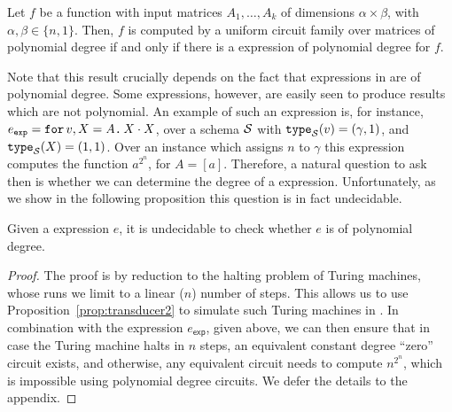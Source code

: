 \begin{theorem}
\label{th-equivalence}
Let $f$ be a function with input matrices $A_1,\ldots ,A_k$ of dimensions $\alpha\times \beta$, with $\alpha,\beta \in \{n,1\}$. Then, $f$ is computed by a uniform circuit family over matrices of polynomial degree if and only if there is a \langfor expression of polynomial degree for $f$. 
\end{theorem}

Note that this result crucially depends on the fact that expressions in \langfor are of polynomial degree.
Some \langfor expressions, however, are easily seen to produce results which are not polynomial.
An example of such an expression is, for instance, $e_{\texttt{exp}} = \texttt{for}\, v,X=A \texttt{.}\, X\cdot X$, over a schema $\mathcal{S}$ with $\texttt{type}_{\mathcal{S}}(v)= (\gamma,1)$, and $\texttt{type}_{\mathcal{S}}(X)=(1,1)$.
Over an instance which assigns $n$ to $\gamma$ this expression computes the function $a^{2^n}$, for $A=[a]$.
Therefore, a natural question to ask then is whether we can determine the degree of a \langfor expression.
Unfortunately, as we show in the following proposition this question is in fact undecidable.


\begin{proposition}
\label{prop-undec}
Given a \langfor expression $e$, %
 it is undecidable to check whether $e$ is of polynomial degree.
\end{proposition}

\begin{proof}
	The proof is by reduction to the halting problem of Turing machines, whose runs we limit to a linear ($n$) number of steps.
This allows us to use Proposition~\ref{prop:transducer2} to simulate such Turing machines in \langfor. In combination 
with the expression $e_{\mathsf{exp}}$, given above, we can then ensure that in case the Turing machine halts in $n$ steps, an equivalent constant degree
``zero'' circuit exists, and otherwise, any equivalent circuit needs to compute $n^{2^n}$, which is impossible using polynomial degree circuits.
We defer the details to the appendix.
\end{proof}


